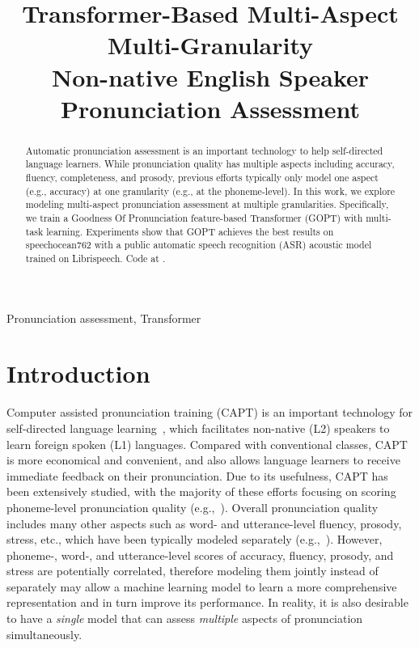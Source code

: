 \documentclass{article}
\title{Transformer-Based Multi-Aspect Multi-Granularity \\ Non-native English Speaker Pronunciation Assessment}
\newcommand{\squeezeup}{\vspace{-1.6mm}}
\begin{document}
%
\maketitle
%
\begin{abstract}
Automatic pronunciation assessment is an important technology to help self-directed language learners. While pronunciation quality has multiple aspects including accuracy, fluency, completeness, and prosody, previous efforts typically only model one aspect (e.g., accuracy) at one granularity (e.g., at the phoneme-level). In this work, we explore modeling multi-aspect pronunciation assessment at multiple granularities. Specifically, we train a Goodness Of Pronunciation feature-based Transformer (GOPT) with multi-task learning. Experiments show that GOPT achieves the best results on speechocean762 with a public automatic speech recognition (ASR) acoustic model trained on Librispeech. Code at \href{https://github.com/YuanGongND/gopt}{\color{blue}{https://github.com/YuanGongND/gopt}}.
\end{abstract}
%
\begin{keywords}
Pronunciation assessment, Transformer
\end{keywords}

\squeezeup\squeezeup
\section{Introduction}
\squeezeup
\label{sec:intro}
Computer assisted pronunciation training (CAPT) is an important technology for self-directed language learning~\cite{Eskenazi2009review, Zechner2009SpeechRater,witt2012automatic}, which facilitates non-native (L2) speakers to learn foreign spoken (L1) languages. Compared with conventional classes, CAPT is more economical and convenient, and also allows language learners to receive immediate feedback on their pronunciation. Due to its usefulness, CAPT has been extensively studied, with the majority of these efforts focusing on scoring phoneme-level pronunciation quality (e.g.,~\cite{Witt2000GOP,zhang2008automatic,luo2009analysis,wang2012improved,hu2015improved,Shi2020ContextawareGOP,van2010using}).  Overall pronunciation quality includes many other aspects such as word- and utterance-level fluency, prosody, stress, etc., which have been typically modeled separately (e.g.,~\cite{cucchiarini1998quantitative,cucchiarini2000quantitative,bagshaw1994automatic,tepperman2005automatic,arias2010automatic, LI2017innotation}). However, phoneme-, word-, and utterance-level scores of accuracy, fluency, prosody, and stress are potentially correlated, therefore modeling them jointly instead of separately may allow a machine learning model to learn a more comprehensive representation and in turn improve its performance. In reality, it is also desirable to have a \emph{single} model that can assess \emph{multiple} aspects of pronunciation simultaneously.
\end{document}
